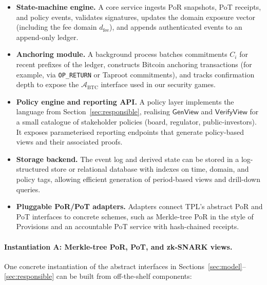 \documentclass[11pt]{article}
\begin{document}
\begin{itemize}[noitemsep]
\item \textbf{State-machine engine.} A core service ingests PoR snapshots, PoT receipts, and policy events, validates
      signatures, updates the domain exposure vector (including the fee domain $d_{\mathrm{fee}}$), and appends
      authenticated events to an append-only ledger.
\item \textbf{Anchoring module.} A background process batches commitments $C_i$ for recent prefixes of the ledger,
      constructs Bitcoin anchoring transactions (for example, via \texttt{OP\_RETURN} or Taproot commitments), and
      tracks confirmation depth to expose the $\mathcal{A}_{\mathrm{BTC}}$ interface used in our security games.
\item \textbf{Policy engine and reporting API.} A policy layer implements the language from Section~\ref{sec:responsible},
      realising $\mathsf{GenView}$ and $\mathsf{VerifyView}$ for a small catalogue of stakeholder policies
      (board, regulator, public-investors).
      It exposes parameterised reporting endpoints that generate policy-based views and their associated proofs.
\item \textbf{Storage backend.} The event log and derived state can be stored in a log-structured store or relational
      database with indexes on time, domain, and policy tags, allowing efficient generation of period-based views
      and drill-down queries.
\item \textbf{Pluggable PoR/PoT adapters.} Adapters connect TPL's abstract PoR and PoT interfaces to concrete schemes,
      such as Merkle-tree PoR in the style of Provisions and an accountable PoT service with hash-chained receipts.
\end{itemize}

\paragraph{Instantiation A: Merkle-tree PoR, PoT, and zk-SNARK views.}
One concrete instantiation of the abstract interfaces in Sections~\ref{sec:model}--\ref{sec:responsible} can be built from
off-the-shelf components:
\end{document}
